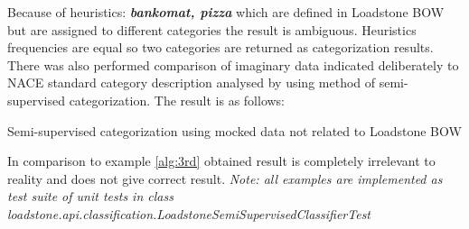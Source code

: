 \newline
Because of heuristics: \textbf{\textit{bankomat, pizza}} which are defined in Loadstone BOW but are assigned to different categories the result is ambiguous. Heuristics frequencies are equal so two categories are returned as categorization results.
\newline
There was also performed comparison of imaginary data indicated deliberately to NACE standard category description analysed by using method of semi-supervised categorization. The result is as follows:
\begin{algorithm}[h]
	
	\hfill \break
	\caption{Semi-supervised categorization using mocked data not related to Loadstone BOW}
	\label{alg:8th}
\end{algorithm}
\newline
In comparison to example \ref{alg:3rd} obtained result is completely irrelevant to reality and does not give correct result.
\newline 
\textit{Note: all examples are implemented as test suite of unit tests in class \newline loadstone.api.classification.LoadstoneSemiSupervisedClassifierTest}

